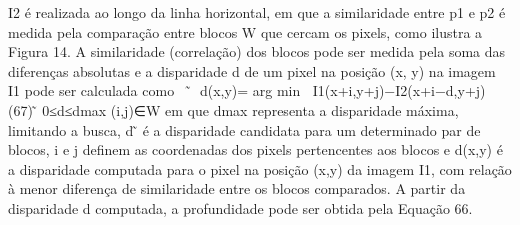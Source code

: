 I2 é realizada ao longo da linha horizontal, em que a similaridade entre p1 e p2 é medida pela comparação entre blocos W que cercam os pixels, como ilustra a Figura 14. A similaridade (correlação) dos blocos pode ser medida pela soma das diferenças absolutas e a disparidade d de um pixel na posição (x, y) na imagem I1 pode ser calculada como
􏰆􏰁 ̃􏰁
d(x,y)= arg min 􏰁􏰁I1(x+i,y+j)−I2(x+i−d,y+j)􏰁􏰁 (67)
 ̃
0≤d≤dmax (i,j)∈W
em que dmax representa a disparidade máxima, limitando a busca, d ̃ é a disparidade candidata para um determinado par de blocos, i e j definem as coordenadas dos pixels pertencentes aos blocos e d(x,y) é a disparidade computada para o pixel na posição (x,y) da imagem I1, com relação à menor diferença de similaridade entre os blocos comparados. A partir da disparidade d computada, a profundidade pode ser obtida pela Equação 66.